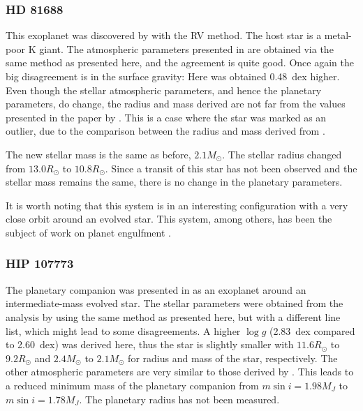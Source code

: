 \subsubsection{HD 81688}
\label{sub:HD81688}

This exoplanet was discovered by \citet{Sato2008} with the RV method. The host star is a metal-poor
K giant. The atmospheric parameters presented in \citet{Sato2008} are obtained via the same method
as presented here, and the agreement is quite good. Once again the big disagreement is in the
surface gravity: Here was obtained \SI{0.48}{dex} higher. Even though the stellar atmospheric
parameters, and hence the planetary parameters, do change, the radius and mass derived are not far
from the values presented in the paper by \citet{Sato2008}. This is a case where the star was marked
as an outlier, due to the comparison between the radius and mass derived from \citet{Torres2010}.

The new stellar mass is the same as before, $2.1M_\odot$. The stellar radius changed from
$13.0R_\odot$ to $10.8R_\odot$. Since a transit of this star has not been observed and the stellar
mass remains the same, there is no change in the planetary parameters.

It is worth noting that this system is in an interesting configuration with a very close orbit
around an evolved star. This system, among others, has been the subject of work on planet engulfment
\citep[see e.g.][]{Kunitomo2011}.


\subsubsection{HIP 107773}
\label{sub:HIP_107773}

The planetary companion was presented in \citet{Jones2015} as an exoplanet around an
intermediate-mass evolved star. The stellar parameters were obtained from the analysis by
\citet{Jones2011} using the same method as presented here, but with a different line list, which
might lead to some disagreements. A higher $\log g$ (\SI{2.83}{dex} compared to \SI{2.60}{dex}) was
derived here, thus the star is slightly smaller with $11.6R_\odot$ to $9.2R_\odot$ and $2.4M_\odot$
to $2.1M_\odot$ for radius and mass of the star, respectively. The other atmospheric parameters are
very similar to those derived by \citet{Jones2011}. This leads to a reduced minimum mass of the
planetary companion from $m\sin i=1.98M_J$ to $m\sin i=1.78M_J$. The planetary radius has not been
measured.



